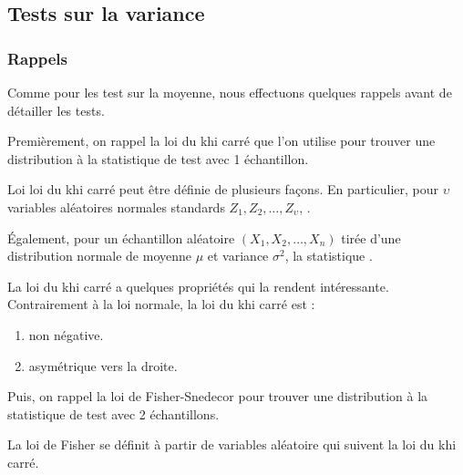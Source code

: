 \documentclass[french]{article}
\begin{document}
\begin{multicols*}{2}
\columnbreak
\subsection{Tests sur la variance}\label{subsec:VarTests}
\subsubsection{Rappels}\label{subsubsec:VarTestsRem}
Comme pour les test sur la moyenne, nous effectuons quelques rappels avant de détailler les tests.

\bigskip

Premièrement, on rappel la loi du khi carré que l'on utilise pour trouver une distribution à la statistique de test avec 1 échantillon.
\begin{rappel_enhanced}
Loi loi du khi carré peut être définie de plusieurs façons. En particulier, pour $\upsilon$ variables aléatoires normales standards $Z_{1}, Z_{2}, \dots, Z_{\upsilon}$, .

\bigskip

Également, pour un échantillon aléatoire $(X_{1}, X_{2}, \dots, X_{n})$ tirée d'une distribution normale de moyenne $\mu$ et variance $\sigma^{2}$, la statistique .

\bigskip

La loi du khi carré a quelques propriétés qui la rendent intéressante. Contrairement à la loi normale, la loi du khi carré est :
\begin{enumerate}[label = \rectangled{\arabic*}{lightgray}]
	\item	non négative.
	\item	asymétrique vers la droite.
\end{enumerate}
\end{rappel_enhanced}

\bigskip

Puis, on rappel la loi de Fisher-Snedecor pour trouver une distribution à la statistique de test avec 2 échantillons.

\begin{rappel_enhanced}
La loi de Fisher se définit à partir de variables aléatoire qui suivent la loi du khi carré. 

\bigskip


\end{rappel_enhanced}
\end{multicols*}
\end{document}
